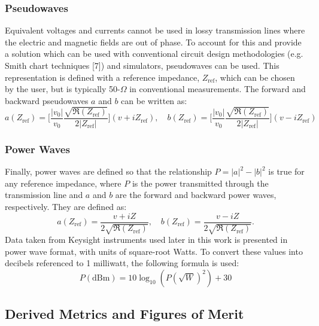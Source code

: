 \documentclass[../thesis.tex]{subfiles}
\begin{document}
\begin{refsection}
\subsubsection{Pseudowaves}

Equivalent voltages and currents cannot be used in lossy transmission lines where the electric and magnetic fields are out of phase. To account for this and provide a solution which can be used with conventional circuit design methodologies (e.g. Smith chart techniques [7]) and simulators, pseudowaves can be used. This representation is defined with a reference impedance, $Z_\textrm{ref}$, which can be chosen by the user, but is typically 50-$\Omega$ in conventional measurements. The forward and backward pseudowaves $a$ and $b$ can be written as:
\begin{equation}
a(Z_\textrm{ref})=\bigg[\dfrac{|v_0|}{v_0}\dfrac{\sqrt{\Re(Z_\textrm{ref})}}{2|Z_\textrm{ref}|}\bigg](v+iZ_\textrm{ref}),\quad b(Z_\textrm{ref})=\bigg[\dfrac{|v_0|}{v_0}\dfrac{\sqrt{\Re(Z_\textrm{ref})}}{2|Z_\textrm{ref}|}\bigg](v-iZ_\textrm{ref})
\end{equation}

\subsubsection{Power Waves}

Finally, power waves are defined so that the relationship $P = |a|^2 - |b|^2$ is true for any reference impedance, where $P$ is the power transmitted through the transmission line and $a$ and $b$ are the forward and backward power waves, respectively. They are defined as:
\begin{equation}
a(Z_\textrm{ref})=\dfrac{v+iZ}{2\sqrt{\Re(Z_\textrm{ref})}},\quad b(Z_\textrm{ref})=\dfrac{v-iZ}{2\sqrt{\Re(Z_\textrm{ref})}}.
\end{equation}
Data taken from Keysight instruments used later in this work is presented in power wave format, with units of square-root Watts. To convert these values into decibels referenced to 1 milliwatt, the following formula is used:
\begin{equation}
P(\textrm{dBm}) = 10\log_{10}(P(\sqrt{W})^2) + 30
\end{equation}

\subsection{Derived Metrics and Figures of Merit}


\end{refsection}
\end{document}
